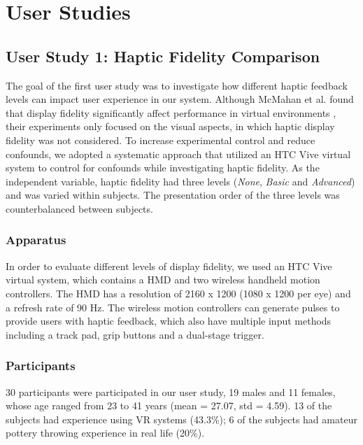 \documentclass{svjour3}                     %
\begin{document}
{\color{blue}


\section{User Studies}
\label{sec:study}

\subsection{User Study 1: Haptic Fidelity Comparison}

The goal of the first user study was to investigate how different haptic feedback levels can impact user experience in our system. 
%
Although McMahan et al. found that display fidelity significantly affect performance in virtual environments \cite{mcmahan2012evaluating}, their experiments only focused on the visual aspects, in which haptic display fidelity was not considered.
%
To increase experimental control and reduce confounds, we adopted a systematic approach that utilized an HTC Vive virtual system to control for confounds while investigating haptic fidelity.
%
As the independent variable, haptic fidelity had three levels (\textit{None}, \textit{Basic} and \textit{Advanced}) and was varied within subjects.
%
The presentation order of the three levels was counterbalanced between subjects.


\subsubsection{Apparatus}
In order to evaluate different levels of display fidelity, we used an HTC Vive virtual system, which contains a HMD and two wireless handheld motion controllers.
The HMD has a resolution of 2160 x 1200 (1080 x 1200 per eye) and a refresh rate of 90 Hz.
The wireless motion controllers can generate pulses to provide users with haptic feedback, which also have multiple input methods including a track pad, grip buttons and a dual-stage trigger.

\subsubsection{Participants}
30 participants were participated in our user study, 19 males and 11 females, whose age ranged from 23 to 41 years (mean = 27.07, std = 4.59). 13 of the subjects had experience using VR systems (43.3\%); 6 of the subjects had amateur pottery throwing experience in real life (20\%).

}
\end{document}
